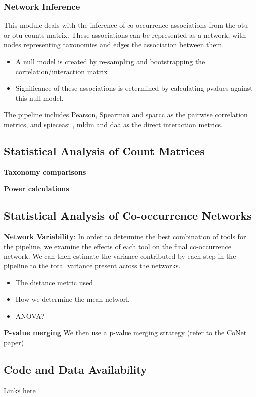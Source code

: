   \subsubsection*{Network Inference}
    \vspace{-5mm}
    This module deals with the inference of co-occurrence associations from the \ac{otu} or \ac{otu} counts matrix.
    These associations can be represented as a network, with nodes representing taxonomies and edges the association between them.
    \begin{itemize}
      \item A null model is created by re-sampling and bootstrapping the correlation/interaction matrix
      \item Significance of these associations is determined by calculating pvalues against this null model.
    \end{itemize}
    The pipeline includes Pearson, Spearman and \ac{sparcc} \cite{Friedman2012} as the pairwise correlation metrics, and \ac{spieceasi} \cite{Kurtz2015}, \ac{mldm} \cite{Yang2017} and \ac{daa} \cite{Menon2018} as the direct interaction metrics.

  \subsection*{Statistical Analysis of Count Matrices}

 \textbf{Taxonomy comparisons}

  \textbf{Power calculations}

  \subsection*{Statistical Analysis of Co-occurrence Networks}

  \textbf{Network Variability}:
  In order to determine the best combination of tools for the pipeline, we examine the effects of each tool on the final co-occurrence network.
  We can then estimate the variance contributed by each step in the pipeline to the total variance present across the networks.
  \begin{itemize}
    \item The distance metric used
    \item How we determine the mean network
    \item ANOVA?
  \end{itemize}

  \textbf{P-value merging}
  We then use a p-value merging strategy (refer to the CoNet paper)

  \subsection*{Code and Data Availability}

  Links here
